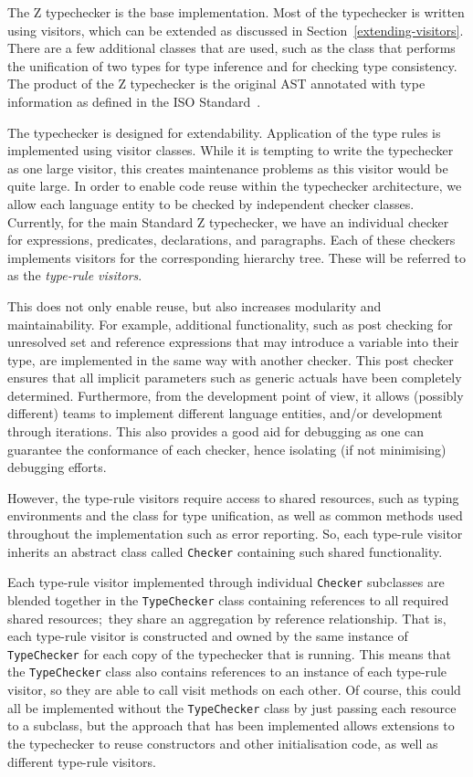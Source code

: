 \documentclass{llncs}
\begin{document}
The Z typechecker is the base implementation. Most of the typechecker
is written using visitors, which can be extended as discussed in
Section~\ref{extending-visitors}. There are a few additional classes
that are used, such as the class that performs the unification of two
types for type inference and for checking type consistency.
The product of the Z typechecker is the original AST annotated with type
information as defined in the ISO Standard~\cite[Section~10]{isoz}.

The typechecker is designed for extendability. Application of the type
rules is implemented using visitor classes. While it is tempting to
write the typechecker as one large visitor, this creates maintenance
problems as this visitor would be quite large.
In order to enable code reuse within the typechecker architecture, we
allow each language entity to be checked by independent checker classes.
Currently, for the main Standard Z typechecker, we have an individual checker
for expressions, predicates, declarations, and paragraphs. Each of these checkers
implements visitors for the corresponding hierarchy tree.
These will be referred to as the {\em type-rule visitors}.

This does not only enable reuse, but also increases modularity and maintainability.
For example, additional functionality, such as post checking for unresolved set and
reference expressions that may introduce a variable into their type, are implemented in
the same way with another checker. This post checker ensures that all implicit
parameters such as generic actuals have been completely determined.
Furthermore, from the development point of view, it allows (possibly different) teams
to implement different language entities, and/or development through iterations.
This also provides a good aid for debugging as one can guarantee the conformance of each
checker, hence isolating (if not minimising) debugging efforts.

However, the type-rule visitors require access to shared resources,
such as typing environments and the class for type unification, as well as
common methods used throughout the implementation such as error reporting.
So, each type-rule visitor inherits an abstract class called {\tt Checker}
containing such shared functionality.

Each type-rule visitor implemented through individual {\tt Checker} subclasses
are blended together in the {\tt TypeChecker} class containing references to all
required shared resources;~they share an aggregation by reference relationship.
That is, each type-rule visitor is constructed and owned by the same instance of
{\tt TypeChecker} for each copy of the typechecker that is running.
This means that the {\tt TypeChecker} class also contains references to an instance
of each type-rule visitor, so they are able to call visit methods on each other.
Of course, this could all be implemented without the {\tt TypeChecker} class by just
passing each resource to a subclass, but the approach that has been implemented allows
extensions to the typechecker to reuse constructors and other initialisation code,
as well as different type-rule visitors.
\end{document}
